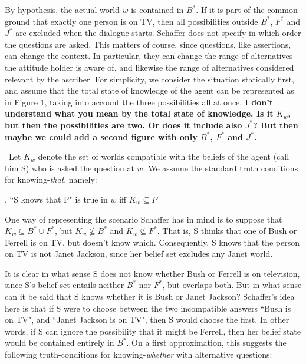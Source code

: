 

By hypothesis, the actual world $w$ is contained in $B^{*}$. If it
is part of the common ground that exactly one person is on TV,
then all possibilities outside $B^{*}$, $F^{*}$ and $J^{*}$ are
excluded when the dialogue starts. Schaffer does not specify in
which order the questions are asked. This matters of course, since
questions, like assertions, can change the context. In particular,
they can change the range of alternatives the attitude holder is
aware of, and likewise the range of alternatives considered
relevant by the ascriber. For simplicity, we consider the
situation statically first, and assume that the total state of
knowledge of the agent can be represented as in Figure 1, taking
into account the three possibilities all at once. {\bf I don't understand what  you mean by the total state of knowledge. Is it $K_w$, but then the possibilities are two. Or does it include also $J^{*}$? But then maybe   we could add a second figure with only $B^{*}$, $F^{*}$ and $J^{*}$.}
 
\ Let $K_w$ denote the set of worlds compatible with the beliefs
of the agent (call him S) who is asked the question at $w$. We
assume the standard truth conditions for knowing-\emph{that},
namely:

\ex. ``S knows that P" is true in $w$ iff $K_w \subseteq P$

One way of representing the scenario Schaffer has in mind is to
suppose that $K_{w} \subseteq B^{*}\cup F^{*}$, but $K_{w}
\nsubseteq B^{*}$ and $K_{w}\nsubseteq F^{*}$. That is, S thinks
that one of Bush or Ferrell is on TV, but doesn't know which.
Consequently, S knows that the person on TV is not Janet Jackson,
since her belief set excludes any Janet world.

It is clear in what sense S does not know whether Bush or Ferrell
is on television, since S's belief set entails neither $B^{*}$ nor
$F^{*}$, but overlaps both. But in what sense can it be said that
S knows whether it is Bush or Janet Jackson? Schaffer's idea here
is that if S were to choose between the two incompatible answers
``Bush is on TV", and ``Janet Jackson is on TV", then S would
choose the first. In other words, if S can ignore the possibility
that it might be Ferrell, then her belief state would be contained
entirely in $B^{*}$. On a first approximation, this suggests the
following truth-conditions for knowing-\emph{whether} with
alternative questions:

